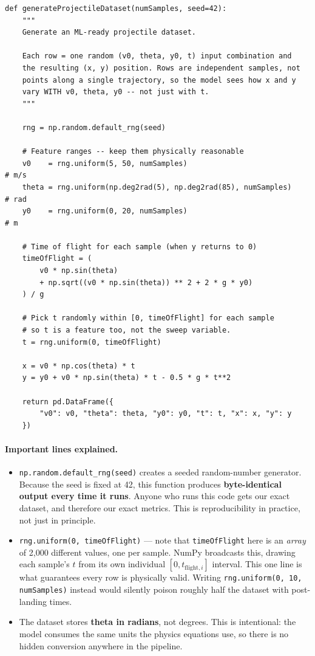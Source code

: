 \documentclass[11pt,a4paper]{article}
\begin{document}
\begin{lstlisting}[caption={Stage 2 --- generating independent random samples.}]
def generateProjectileDataset(numSamples, seed=42):
    """
    Generate an ML-ready projectile dataset.

    Each row = one random (v0, theta, y0, t) input combination and
    the resulting (x, y) position. Rows are independent samples, not
    points along a single trajectory, so the model sees how x and y
    vary WITH v0, theta, y0 -- not just with t.
    """

    rng = np.random.default_rng(seed)

    # Feature ranges -- keep them physically reasonable
    v0    = rng.uniform(5, 50, numSamples)                            # m/s
    theta = rng.uniform(np.deg2rad(5), np.deg2rad(85), numSamples)    # rad
    y0    = rng.uniform(0, 20, numSamples)                            # m

    # Time of flight for each sample (when y returns to 0)
    timeOfFlight = (
        v0 * np.sin(theta)
        + np.sqrt((v0 * np.sin(theta)) ** 2 + 2 * g * y0)
    ) / g

    # Pick t randomly within [0, timeOfFlight] for each sample
    # so t is a feature too, not the sweep variable.
    t = rng.uniform(0, timeOfFlight)

    x = v0 * np.cos(theta) * t
    y = y0 + v0 * np.sin(theta) * t - 0.5 * g * t**2

    return pd.DataFrame({
        "v0": v0, "theta": theta, "y0": y0, "t": t, "x": x, "y": y
    })
\end{lstlisting}

\paragraph{Important lines explained.}
\begin{itemize}[leftmargin=2em,itemsep=0.2em]
  \item \texttt{np.random.default\_rng(seed)} creates a seeded random-number generator. Because the
        seed is fixed at 42, this function produces \textbf{byte-identical output every time it
        runs}. Anyone who runs this code gets our exact dataset, and therefore our exact metrics.
        This is reproducibility in practice, not just in principle.
  \item \texttt{rng.uniform(0, timeOfFlight)} --- note that \texttt{timeOfFlight} here is an
        \emph{array} of 2{,}000 different values, one per sample. NumPy broadcasts this, drawing
        each sample's $t$ from its own individual $[0,t_{\text{flight},i}]$ interval. This one line
        is what guarantees every row is physically valid. Writing
        \texttt{rng.uniform(0, 10, numSamples)} instead would silently poison roughly half the
        dataset with post-landing times.
  \item The dataset stores \textbf{theta in radians}, not degrees. This is intentional: the model
        consumes the same units the physics equations use, so there is no hidden conversion anywhere
        in the pipeline.
\end{itemize}
\end{document}
